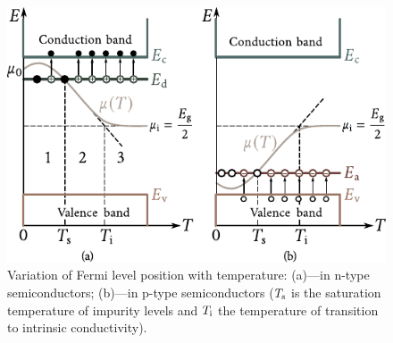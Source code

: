 \begin{figure}[t]
	\begin{center}
		\includegraphics[scale=1]{figures/ch_05/fig_5_19.pdf}
		\caption[]{Variation of Fermi level position with temperature: (a)---in n-type semiconductors; (b)---in p-type semiconductors ($T_{\text{s}}$ is the saturation temperature of impurity levels and $T_{\text{i}}$ the temperature of transition to intrinsic conductivity).}
		\label{fig:5_19}
	\end{center}
	\vspace{-0.7cm}
\end{figure}
